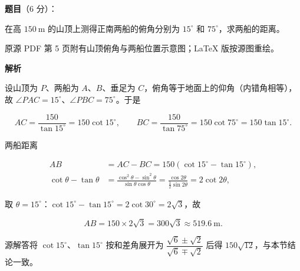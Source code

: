 \begin{answer}

\textbf{题目}（6 分）：

在高 $150\ \mathrm{m}$ 的山顶上测得正南两船的俯角分别为 $15^\circ$ 和 $75^\circ$，求两船的距离。

\begin{gktip}
原源 PDF 第 5 页附有山顶俯角与两船位置示意图；LaTeX 版按源图重绘。
\end{gktip}
\nopagebreak[4]
\begin{center}\end{center}
\nopagebreak[4]
\textbf{解析}

设山顶为 $P$、两船为 $A\text{、}B$、垂足为 $C$，俯角等于地面上的仰角（内错角相等），故 $\angle PAC=15^\circ$、$\angle PBC=75^\circ$。于是

\nopagebreak[4]
\[
AC=\frac{150}{\tan15^\circ}=150\cot15^\circ,
\qquad
BC=\frac{150}{\tan75^\circ}=150\cot75^\circ=150\tan15^\circ.
\]

两船距离

\nopagebreak[4]
\[
\begin{aligned}
AB&=AC-BC=150(\cot15^\circ-\tan15^\circ),\\
\cot\theta-\tan\theta&=\frac{\cos^2\theta-\sin^2\theta}{\sin\theta\cos\theta}
=\frac{\cos2\theta}{\frac12\sin2\theta}=2\cot2\theta,
\end{aligned}
\]

取 $\theta=15^\circ$：$\cot15^\circ-\tan15^\circ=2\cot30^\circ=2\sqrt3$，故

\nopagebreak[4]
\[
AB=150\times2\sqrt3=300\sqrt3\approx519.6\ \mathrm{m}.
\]

源解答将 $\cot15^\circ\text{、}\tan15^\circ$ 按和差角展开为 $\dfrac{\sqrt6\pm\sqrt2}{\sqrt6\mp\sqrt2}$ 后得 $150\sqrt{12}$，与本节结论一致。
\nopagebreak[4]
\begin{center}\end{center}
\nopagebreak[4]

\end{answer}
